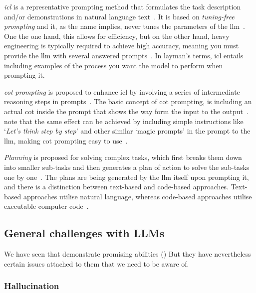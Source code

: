 \emph{\acrfull{icl}} is a representative prompting method that formulates the task
description and/or demonstrations in natural language text~\cite[44]{llmSurvey}. It is based on
\textit{tuning-free prompting} and it, as the name implies, never tunes the parameters of the
\acrshort{llm}~\cite[15]{promptingSurvey}. One the one hand, this allows for efficiency, but on the
other hand, heavy engineering is typically required to achieve high accuracy, meaning you must
provide the \acrshort{llm} with several answered prompts~\cite[16]{promptingSurvey}. In layman's
terms, \acrshort{icl} entails including examples of the process you want the model to perform when
prompting it.

\emph{\acrfull{cot} prompting} is proposed to enhance \acrlong{icl} by involving a
series of intermediate reasoning steps in prompts~\cite[44, 52]{llmSurvey}. The basic concept of
\acrshort{cot} prompting, is including an actual \acrlong{cot} inside the prompt that shows the way
form the input to the output~\cite[52]{llmSurvey}.~\citeauthor{llmSurvey} note that the same effect
can be achieved by including simple instructions like `\textit{Let's think step by step}' and other
similar `magic prompts' in the prompt to the \acrshort{llm}, making \acrshort{cot} prompting easy to
use~\cite[52]{llmSurvey}.

\emph{Planning} is proposed for solving complex tasks, which first breaks them down into smaller
sub-tasks and then generates a plan of action to solve the sub-tasks one by
one~\cite[44, 54]{llmSurvey}. The plans are being generated by the \acrshort{llm} itself upon
prompting it, and there is a distinction between text-based and code-based approaches. Text-based
approaches utilise natural language, whereas code-based approaches utilise executable computer code~\cite[54-55]{llmSurvey}.

\newpage %

\subsection{General challenges with LLMs}\label{sec:llmProblems}

We have seen that  demonstrate promising abilities () But they have nevertheless certain issues attached to them that we need to be aware of.

\subsubsection{Hallucination}\label{sec:llmHallucination}

